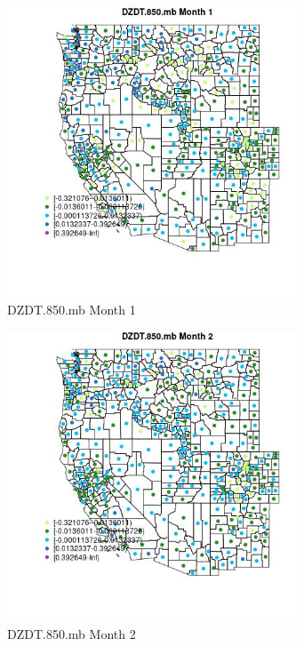 \begin{figure} 
\centering  
\includegraphics[width=0.77\textwidth]{Code_Outputs/df_report_ML_predictors_CountyCentroid_Locations_Dates_2008-01-01to2018-12-31_MapObsMo1DZDT850mb.jpg} 
\caption{\label{fig:df_report_ML_predictors_CountyCentroid_Locations_Dates_2008-01-01to2018-12-31MapObsMo1DZDT850mb}DZDT.850.mb Month 1} 
\end{figure} 
 

\begin{figure} 
\centering  
\includegraphics[width=0.77\textwidth]{Code_Outputs/df_report_ML_predictors_CountyCentroid_Locations_Dates_2008-01-01to2018-12-31_MapObsMo2DZDT850mb.jpg} 
\caption{\label{fig:df_report_ML_predictors_CountyCentroid_Locations_Dates_2008-01-01to2018-12-31MapObsMo2DZDT850mb}DZDT.850.mb Month 2} 
\end{figure} 
 

